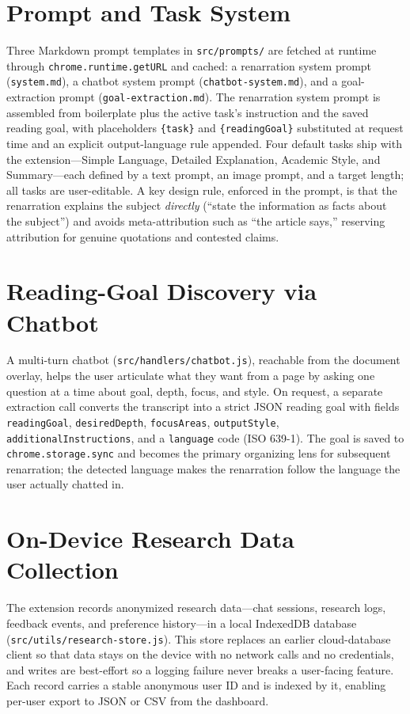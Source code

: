 \documentclass[a4paper,12pt]{report}
\begin{document}
\section{Prompt and Task System}
Three Markdown prompt templates in \texttt{src/prompts/} are fetched at runtime
through \texttt{chrome.runtime.getURL} and cached: a renarration system prompt
(\texttt{system.md}), a chatbot system prompt (\texttt{chatbot-system.md}), and a
goal-extraction prompt (\texttt{goal-extraction.md}). The renarration system
prompt is assembled from boilerplate plus the active task's instruction and the
saved reading goal, with placeholders \texttt{\{task\}} and
\texttt{\{readingGoal\}} substituted at request time and an explicit
output-language rule appended. Four default tasks ship with the
extension---Simple Language, Detailed Explanation, Academic Style, and
Summary---each defined by a text prompt, an image prompt, and a target length;
all tasks are user-editable. A key design rule, enforced in the prompt, is that
the renarration explains the subject \emph{directly} (``state the information as
facts about the subject'') and avoids meta-attribution such as ``the article
says,'' reserving attribution for genuine quotations and contested claims.

\section{Reading-Goal Discovery via Chatbot}
A multi-turn chatbot (\texttt{src/handlers/chatbot.js}), reachable from the
document overlay, helps the user articulate what they want from a page by asking
one question at a time about goal, depth, focus, and style. On request, a separate
extraction call converts the transcript into a strict JSON reading goal with
fields \texttt{readingGoal}, \texttt{desiredDepth}, \texttt{focusAreas},
\texttt{outputStyle}, \texttt{additionalInstructions}, and a \texttt{language}
code (ISO 639-1). The goal is saved to \texttt{chrome.storage.sync} and becomes
the primary organizing lens for subsequent renarration; the detected language
makes the renarration follow the language the user actually chatted in.

\section{On-Device Research Data Collection}
The extension records anonymized research data---chat sessions, research logs,
feedback events, and preference history---in a local IndexedDB database
(\texttt{src/utils/research-store.js}). This store replaces an earlier
cloud-database client so that data stays on the device with no network calls and
no credentials, and writes are best-effort so a logging failure never breaks a
user-facing feature. Each record carries a stable anonymous user ID and is
indexed by it, enabling per-user export to JSON or CSV from the dashboard.
\end{document}
